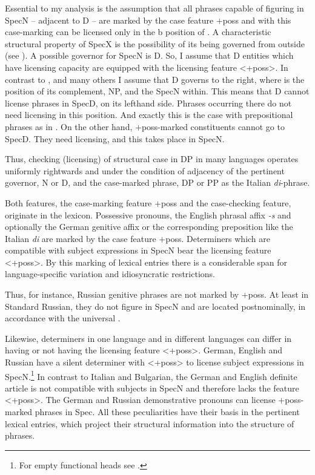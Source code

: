 \documentclass[output=paper,colorlinks,citecolor=brown]{langscibook}
\begin{document}
Essential to my analysis is the assumption that all phrases capable of figuring in SpecN -- adjacent to D -- are marked by the case feature $+$poss and with this case-marking can be licensed only in the b position of . A characteristic structural property of SpecX is the possibility of its being governed from outside (see \citealt{Chomsky86Barriers, Chomsky86Knowledge-of-language}). A possible governor for SpecN is D. So, I assume that D entities which have licensing capacity are equipped with the licensing feature <+poss>. In contrast to \citet{Fukui86A-theory}, \citet{Abney86Functional-elements, Abney87The-English} and many others I assume that D governs to the right, where is the position of its complement, NP, and the SpecN within. This means that D cannot license phrases in SpecD, on its lefthand side. Phrases occurring there do not need licensing in this position. And exactly this is the case with prepositional phrases as in . On the other hand, $+$poss-marked constituents cannot go to SpecD. They need licensing, and this takes place in SpecN.

Thus, checking (licensing) of structural case in DP in many languages operates uniformly rightwards and under the condition of adjacency of the pertinent governor, N or D, and the case-marked phrase, DP or PP as the Italian \textit{di}-phrase.

Both features, the case-marking feature $+$poss and the case-checking feature, originate in the lexicon. Possessive pronouns, the English phrasal affix \textit{-s} and optionally the German genitive affix or the corresponding preposition like the Italian \textit{di} are marked by the case feature $+$poss. Determiners which are compatible with subject expressions in SpecN bear the licensing feature <+poss>. By this marking of lexical entries there is a considerable span for language-specific variation and idiosyncratic restrictions.

Thus, for instance, Russian genitive phrases are not marked by $+$poss. At least in Standard Russian, they do not figure in SpecN and are located postnominally, in accordance with the universal .

Likewise, determiners in one language and in different languages can differ in having or not having the licensing feature <+poss>. German, English and Russian have a silent determiner with <+poss> to license subject expressions in SpecN.\footnote{For empty functional heads see \citet{Zimmermann88Wohin-mit-Affixen, Zimmermann90Zur-Legitimierung}.} In contrast to Italian and Bulgarian, the German and English definite article is not compatible with subjects in SpecN and therefore lacks the feature <+poss>. The German and Russian demonstrative pronouns can license $+$poss-marked phrases in Spec. All these peculiarities have their basis in the pertinent lexical entries, which project their structural information into the structure of phrases.
\end{document}
